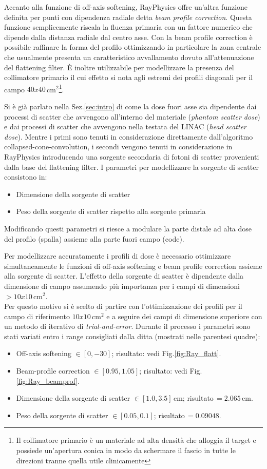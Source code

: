 Accanto alla funzione di off-axis softening, RayPhysics offre un'altra funzione definita per punti con dipendenza radiale detta \textit{beam profile correction}. Questa funzione semplicemente riscala la fluenza primaria con un fattore numerico che dipende dalla distanza radiale dal centro asse. Con la beam profile correction è possibile raffinare la forma del profilo ottimizzando in particolare la zona centrale che usualmente presenta un caratteristico avvallamento dovuto all'attenuazione del flattening filter. \`E inoltre utilizzabile per modellizzare la presenza del collimatore primario il cui effetto si nota agli estremi dei profili diagonali per il campo $40x40\,$cm$^2$\footnote{Il collimatore primario è un materiale ad alta densità che alloggia il target e possiede un'apertura conica in modo da schermare il fascio in tutte le direzioni tranne quella utile clinicamente}.

Si è già parlato nella Sez.\ref{sec:intro} di come la dose fuori asse sia dipendente dai processi di scatter che avvengono all'interno del materiale (\textit{phantom scatter dose}) e dai processi di scatter che avvengono nella testata del LINAC (\textit{head scatter dose}). Mentre i primi sono tenuti in considerazione direttamente dall'algoritmo collapsed-cone-convolution, i secondi vengono tenuti in considerazione in RayPhysics introducendo una sorgente secondaria di fotoni di scatter provenienti dalla base del flattening filter. I parametri per modellizzare la sorgente di scatter consistono in:
\begin{itemize}
\item Dimensione della sorgente di scatter
\item Peso della sorgente di scatter rispetto alla sorgente primaria
\end{itemize}
Modificando questi parametri si riesce a modulare la parte distale ad alta dose del profilo (spalla) assieme alla parte fuori campo (code).

Per modellizzare accuratamente i profili di dose è necessario ottimizzare simultaneamente le funzioni di off-axis softening e beam profile correction assieme alla sorgente di scatter. L'effetto della sorgente di scatter è dipendente dalla dimensione di campo assumendo più importanza per i campi di dimensioni $> 10x10\,$cm$^2$.\\
Per questo motivo si è scelto di partire con l'ottimizzazione dei profili per il campo di riferimento $10x10\,$cm$^2$ e a seguire dei campi di dimensione superiore con un metodo di iterativo di \textit{trial-and-error}. Durante il processo i parametri sono stati variati entro i range consigliati dalla ditta (mostrati nelle parentesi quadre):
\begin{itemize}
\item Off-axis softening $\in[0,-30]$; risultato: vedi Fig.\ref{fig:Ray_flatt}.
\item Beam-profile correction $\in[0.95,1.05]$; risultato: vedi Fig.\ref{fig:Ray_beamprof}.
\item Dimensione della sorgente di scatter $\in[1.0,3.5]\,$cm; risultato$\,=2.065\,$cm.
\item Peso della sorgente di scatter $\in[0.05,0.1]$; risultato$\,=0.09048$.
\end{itemize}

